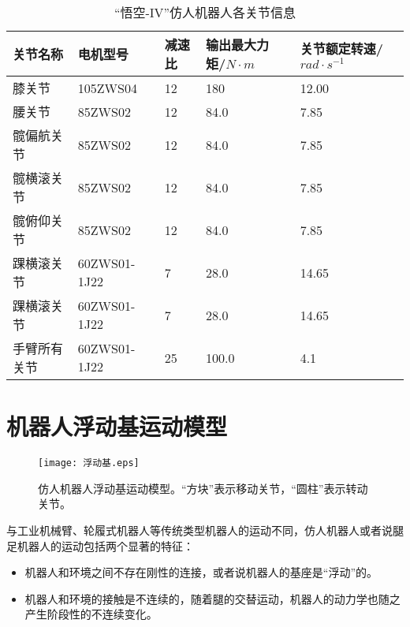 \begin{table}[htbp]
	\centering
	\caption{“悟空-IV”仿人机器人各关节信息}
	\label{joint_motor}
	\begin{tabular}{m{3cm}<{\centering}m{3cm}<{\centering}m{1.5cm}<{\centering}m{2cm}<{\centering}m{2.5cm}<{\centering}}
		\toprule  %
		关节名称   &电机型号  &减速比  &输出最大力矩/$N \cdot m$ &关节额定转速/$rad\cdot s^{-1}$ \\
		\midrule  %
		膝关节 & 105ZWS04 & 12 & 180 & 12.00\\
		腰关节 & 85ZWS02 & 12 & 84.0 & 7.85\\        
		髋偏航关节 & 85ZWS02 & 12 & 84.0 & 7.85\\
		髋横滚关节 & 85ZWS02 & 12 & 84.0 & 7.85\\
		髋俯仰关节 & 85ZWS02 & 12 & 84.0 & 7.85\\
        踝横滚关节 & 60ZWS01-1J22 & 7 & 28.0 & 14.65\\
        踝横滚关节 & 60ZWS01-1J22 & 7 & 28.0 & 14.65\\
        手臂所有关节 & 60ZWS01-1J22 & 25 & 100.0 & 4.1\\
		\bottomrule %
	\end{tabular}
\end{table}
\section{机器人浮动基运动模型}
\label{sec:floating_base}
\begin{figure}[htbp]
    \centering
    \texttt{[image: 浮动基.eps]}
    \caption{\label{fig:floating_base}仿人机器人浮动基运动模型。“方块”表示移动关节，“圆柱”表示转动关节。}
\end{figure}

与工业机械臂、轮履式机器人等传统类型机器人的运动不同，仿人机器人或者说腿足机器人的运动包括两个显著的特征：
\begin{itemize}
    \item 机器人和环境之间不存在刚性的连接，或者说机器人的基座是“浮动”的。
    \item 机器人和环境的接触是不连续的，随着腿的交替运动，机器人的动力学也随之产生阶段性的不连续变化。
\end{itemize}

